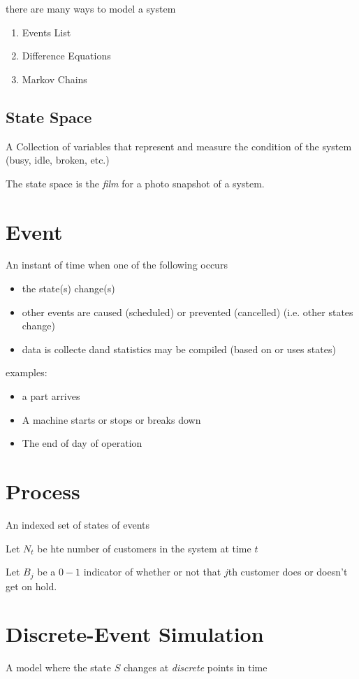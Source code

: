 \documentclass[fleqn]{report}
\begin{document}
there are many ways to model a system 
\begin{enumerate}
    \item 
    Events List 
    \item 
    Difference Equations 
    \item 
    Markov Chains 
\end{enumerate}

\subsection{State Space}
A Collection of variables that represent and measure the condition of the system 
(busy, idle, broken, etc.)

The state space is the \textit{film} for a photo snapshot of a system.

\section{Event}
An instant of time when one of the following occurs 

\begin{itemize}
    \item
    the state(s) change(s)
    \item 
    other events are caused (scheduled) or prevented (cancelled)
    (i.e. other states change)
    \item 
    data is collecte dand statistics may be compiled 
    (based on or uses states)
\end{itemize}

examples:
\begin{itemize}
    \item
    a part arrives 
    \item
    A machine starts or stops or breaks down 
    \item
    The end of day of operation 
\end{itemize}

\section{Process}
An indexed set of states of events 

Let $N_t$ be hte number of customers in the system at time $t$ 

Let $B_j$ be a $0-1$ indicator of whether or not that $j$th customer does 
or doesn't get on hold. 

\section{Discrete-Event Simulation}
A model where the state $S$ changes at \textit{discrete} points in time 
\end{document}
